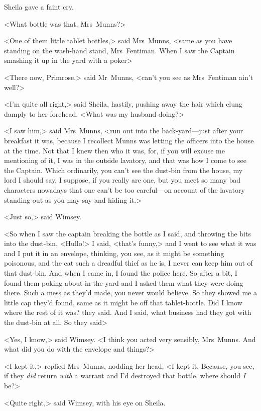 Sheila gave a faint cry.

<What bottle was that, Mrs~Munns?>

<One of them little tablet bottles,> said Mrs~Munns, <same as you have standing on the wash-hand stand, Mrs~Fentiman. When I saw the Captain smashing it up in the yard with a poker\longdash>

<There now, Primrose,> said Mr~Munns, <can't you see as Mrs~Fentiman ain't well?>

<I'm quite all right,> said Sheila, hastily, pushing away the hair which clung damply to her forehead. <What was my husband doing?>

<I saw him,> said Mrs~Munns, <run out into the back-yard—just after your breakfast it was, because I recollect Munns was letting the officers into the house at the time. Not that I knew then who it was, for, if you will excuse me mentioning of it, I was in the outside lavatory, and that was how I come to see the Captain. Which ordinarily, you can't see the dust-bin from the house, my lord I should say, I suppose, if you really are one, but you meet so many bad characters nowadays that one can't be too careful—on account of the lavatory standing out as you may say and hiding it.>

<Just so,> said Wimsey.

<So when I saw the captain breaking the bottle as I said, and throwing the bits into the dust-bin, <Hullo!> I said, <that's funny,> and I went to see what it was and I put it in an envelope, thinking, you see, as it might be something poisonous, and the cat such a dreadful thief as he is, I never can keep him out of that dust-bin. And when I came in, I found the police here. So after a bit, I found them poking about in the yard and I asked them what they were doing there. Such a mess as they'd made, you never would believe. So they showed me a little cap they'd found, same as it might be off that tablet-bottle. Did I know where the rest of it was? they said. And I said, what business had they got with the dust-bin at all. So they said\longdash>

<Yes, I know,> said Wimsey. <I think you acted very sensibly, Mrs~Munns. And what did you do with the envelope and things?>

<I kept it,> replied Mrs~Munns, nodding her head, <I kept it. Because, you see, if they \emph{did} return \emph{with} a warrant and I'd destroyed that bottle, where should \emph{I} be?>

<Quite right,> said Wimsey, with his eye on Sheila.

